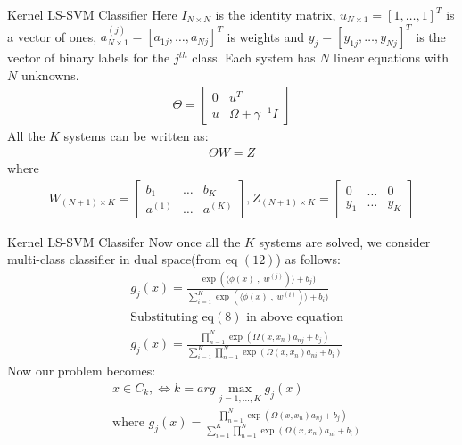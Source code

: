 \documentclass{beamer}
\begin{document}
    \begin{frame}{Kernel LS-SVM Classifier}
        Here $I_{N \times N}$ is the identity matrix, $u_{N \times 1} = [1,\ldots,1]^{T}$ is a vector of ones,
        $a^{(j)}_{N \times 1} = [a_{1j}, \ldots, a_{Nj}]^{T}$ is weights and $y_{j} = [y_{1j}, \ldots, y_{Nj}]^{T}$ is the
        vector of binary labels for the $j^{th}$ class.
        Each system has $N$ linear equations with $N$ unknowns.
        \begin{align}
            \Theta = \begin{bmatrix}
                         0 & u^{T}                 \\
                         u & \Omega + \gamma^{-1}I
            \end{bmatrix}
        \end{align}
        All the $K$ systems can be written as:
        \begin{align}
            \Theta W = Z
        \end{align}
        where
        \begin{align*}
            W_{(N+1) \times K} = \begin{bmatrix}
                                     b_{1}   & \ldots & b_{K}   \\
                                     a^{(1)} & \ldots & a^{(K)}
            \end{bmatrix}
            , Z_{(N+1) \times K} = \begin{bmatrix}
                                       0     & \ldots & 0     \\
                                       y_{1} & \ldots & y_{K}
            \end{bmatrix}
        \end{align*}
    \end{frame}
    \begin{frame}{Kernel LS-SVM Classifer}
        Now once all the $K$ systems are solved, we consider multi-class classifier in dual space(from eq $(12)$) as follows:
        \begin{align*}
            &g_{j}(x) = \frac{\exp(\langle \phi(x)\;,\; w^{(j)})\rangle + b_{j})}{\sum_{i=1}^{K} \exp(\langle \phi(x)\;,\; w^{(i)})\rangle + b_{i})}\\
            &\text{Substituting eq$(8)$ in above equation} \\
            &g_{j}(x) = \frac{\prod_{n=1}^{N}\exp(\Omega(x,x_{n})a_{nj} + b_{j})}{\sum_{i=1}^{K} \prod_{n=1}^{N}\exp(\Omega(x,x_{n})a_{ni} + b_{i})}
        \end{align*}
        Now our problem becomes:
        \begin{align*}
            & x \in C_{k}, \Leftrightarrow k= arg \max_{j=1,\ldots,K} g_{j}(x)\\
            & \text{where } g_{j}(x) = \frac{\prod_{n=1}^{N}\exp(\Omega(x,x_{n})a_{nj} + b_{j})}{\sum_{i=1}^{K} \prod_{n=1}^{N}\exp(\Omega(x,x_{n})a_{ni} + b_{i})}
        \end{align*}

    \end{frame}
\end{document}
